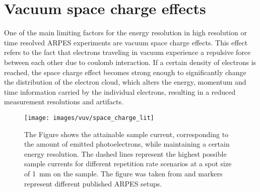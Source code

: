 \section{Vacuum space charge effects}
\label{sec:space_charge}

One of the main limiting factors for the energy resolution in high resolution or time resolved ARPES experiments are vacuum space charge effects.
This effect refers to the fact that electrons traveling in vacuum experience a repulsive force between each other due to coulomb interaction.
If a certain density of electrons is reached, the space charge effect becomes strong enough to significantly change the distribution of the electron cloud, which alters the energy, momentum and time information carried by the individual electrons, resulting in a reduced measurement resolutions and artifacts.

\begin{figure}[b!]
	\centering
	\texttt{[image: images/vuv/space\_charge\_lit]}
	\caption{The Figure shows the attainable sample current, corresponding to the amount of emitted photoelectrons, while maintaining a certain energy resolution. The dashed lines represent the highest possible sample currents for different repetition rate scenarios at a spot size of \qty{1}{\milli\meter} on the sample. The figure was taken from \cite{corder_ultrafast_2018} and markers represent different published ARPES setups.}
	\label{fig:spacechargelit}
\end{figure}


